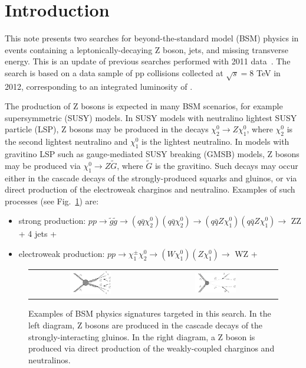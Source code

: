 \section{Introduction}
\label{ref:intro}

This note presents two searches for beyond-the-standard model (BSM) physics in events
containing a leptonically-decaying Z boson, jets, and missing transverse energy. This
is an update of previous searches performed with 2011 data~\cite{ref:Zpaper,ref:EWKPAS}.
The search is based on a data sample of pp collisions collected at $\sqrt{s}=8$ TeV in 2012,
corresponding to an integrated luminosity of \lumi.

The production of Z bosons is expected in many BSM scenarios, for example supersymmetric (SUSY)
models. In SUSY models with neutralino lightest SUSY particle (LSP), Z bosons may be produced in the decays $\chi^0_2\to Z \chi^0_1$,
where $\chi^0_2$ is the second lightest neutralino and $\chi^0_1$ is
the lightest neutralino.
In models with gravitino LSP such as gauge-mediated SUSY breaking (GMSB) models, Z bosons may be produced via
$\chi^0_1\to Z \tilde{G}$, where $\tilde{G}$ is the gravitino. Such decays may occur either in the cascade
decays of the strongly-produced squarks and gluinos, or via direct production of the electroweak
charginos and neutralino. Examples of such processes (see Fig.~\ref{fig:diagrams}) are:

\begin{itemize}
\item strong production:      $pp\to\tilde{g}\tilde{g}\to (q\bar{q}\chi^0_2) (q\bar{q}\chi^0_2)\to(q\bar{q}Z\chi^0_1) (q\bar{q}Z\chi^0_1)\to$ ZZ + 4 jets + \MET
\item electroweak production: $pp\to\chi^\pm_1\chi^0_2\to (W \chi^0_1)(Z \chi^0_1) \to$ WZ + \MET
\end{itemize}

\begin{figure}[!h]
\begin{center}
\begin{tabular}{cc}
\includegraphics[width=0.35\textwidth]{plots/T5zz.pdf} &
\includegraphics[width=0.35\textwidth]{plots/TChiwz.pdf} \\
\end{tabular}
\caption{
Examples of BSM physics signatures targeted in this search. In the left diagram, Z bosons are produced
in the cascade decays of the strongly-interacting gluinos. In the right diagram, a Z boson is produced
via direct production of the weakly-coupled charginos and neutralinos.
\label{fig:diagrams}
}
\end{center}
\end{figure}

